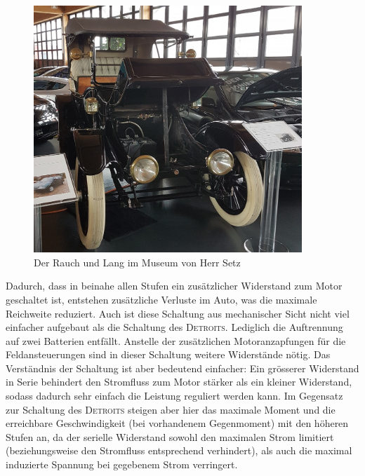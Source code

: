 \begin{figure}[p]
	\centering
		\includegraphics[width=0.9\textwidth]{images/Setz.JPG}
	\caption{Der Rauch und Lang im Museum von Herr Setz}
	\label{fig:Setz}
\end{figure}

Dadurch, dass in beinahe allen Stufen ein zusätzlicher Widerstand zum Motor geschaltet ist, entstehen zusätzliche Verluste im Auto, was die maximale Reichweite reduziert. Auch ist diese Schaltung aus mechanischer Sicht nicht viel einfacher aufgebaut als die Schaltung des \textsc{Detroits}. Lediglich die Auftrennung auf zwei Batterien entfällt. Anstelle der zusätzlichen Motoranzapfungen für die Feldansteuerungen sind in dieser Schaltung weitere Widerstände nötig. Das Verständnis der Schaltung ist aber bedeutend einfacher: Ein grösserer Widerstand in Serie behindert den Stromfluss zum Motor stärker als ein kleiner Widerstand, sodass dadurch sehr einfach die Leistung reguliert werden kann. Im Gegensatz zur Schaltung des \textsc{Detroits} steigen aber hier das maximale Moment und die erreichbare Geschwindigkeit (bei vorhandenem Gegenmoment) mit den höheren Stufen an, da der serielle Widerstand sowohl den maximalen Strom limitiert (beziehungsweise den Stromfluss entsprechend verhindert), als auch die maximal induzierte Spannung bei gegebenem Strom verringert.